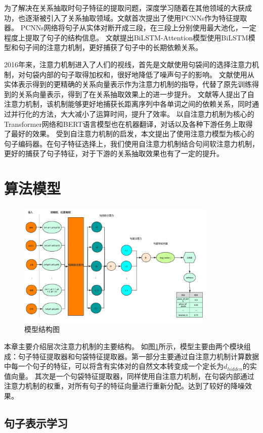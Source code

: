 \documentclass[UTF8]{csoarticle}
\begin{document}
为了解决在关系抽取时句子特征的提取问题，深度学习随着在其他领域的大获成功，也逐渐被引入了关系抽取领域。文献\cite{bib4}首次提出了使用PCNNs作为特征提取器。
PCNNs网络将句子从实体对断开成三段，在三段上分别使用最大池化，一定程度上提取了句子的结构信息。
文献\cite{bib5}提出BiLSTM-Attention模型使用BiLSTM模型和句子间的注意力机制，更好捕获了句子中的长期依赖关系。

2016年来，注意力机制进入了人们的视线，首先是文献\cite{bib6}使用句袋间的选择注意力机制，对句袋内部的句子取得加权和，很好地降低了噪声句子的影响。
文献\cite{bib7}使用从实体表示得到的更精确的关系向量表示作为注意力机制的指导，代替了原先训练得到的关系向量表示，得到了在关系抽取效果上的进一步提升。
文献\cite{bib8}等人提出了自注意力机制，该机制能够更好地捕获长距离序列中各单词之间的依赖关系，同时通过并行化的方法，大大减小了运算时间，提升了效率。
以自注意力机制为核心的Transformer网络和BERT语言模型也在机器翻译，对话以及各种下游任务上取得了最好的效果。
受到自注意力机制的启发，本文提出了使用注意力模型为核心的句子编码器。在句子特征选择上，我们使用自注意力机制结合句间软注意力机制，更好的捕获了句子特征，对于下游的关系抽取效果也有了一定的提升。
\section{算法模型}
\begin{figure}
    \centering\includegraphics[height=6cm]{structure.png}
    \caption{模型结构图}
    \label{fig:structure}
    \end{figure}

本章主要介绍层次注意力机制的主要结构。
如图\ref{fig:structure}所示，模型主要由两个模块组成：句子特征提取器和句袋特征提取器。第一部分主要通过自注意力机制计算数据中每一个句子的特征，可以将含有实体对的自然文本转变成一个定长为$d_{hidden}$的实值向量。
其次是一个句袋特征提取器，同样使用自注意力机制，在句袋内部通过注意力机制的权重，对所有句子的特征向量进行重新分配。达到了较好的降噪效果。
\subsection{句子表示学习}
\end{document}
